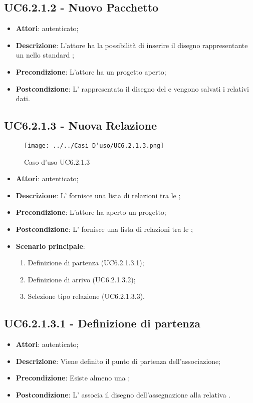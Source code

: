 \subsection{UC6.2.1.2 - Nuovo Pacchetto}
\label{ssec:UC6.2.1.2}
\begin{itemize}
\item \textbf{Attori}:  autenticato;
\item \textbf{Descrizione}: L'attore ha la possibilità di inserire il disegno rappresentante un  nello standard ;
\item \textbf{Precondizione}: L'attore ha un progetto aperto;
\item \textbf{Postcondizione}: L' rappresentata il disegno del  e vengono salvati i relativi dati.
\end{itemize}
\newpage
\subsection{UC6.2.1.3 - Nuova Relazione}
\label{ssec:UC6.2.1.3}
\begin{figure}[h!]
\centering
\texttt{[image: ../../Casi D'uso/UC6.2.1.3.png]}
\caption{Caso d'uso UC6.2.1.3}
 \end{figure}
\begin{itemize}
\item \textbf{Attori}:  autenticato;
\item \textbf{Descrizione}: L' fornisce una lista di relazioni tra le ;
\item \textbf{Precondizione}: L'attore ha aperto un progetto;
\item \textbf{Postcondizione}: L' fornisce una lista di relazioni tra le ;
\item \textbf{Scenario principale}: \begin{enumerate}\item Definizione  di partenza (UC6.2.1.3.1);\item Definizione  di arrivo (UC6.2.1.3.2);\item Selezione tipo relazione (UC6.2.1.3.3).
 \end{enumerate}
\end{itemize}
\subsection{UC6.2.1.3.1 - Definizione  di partenza}
\label{ssec:UC6.2.1.3.1}
\begin{itemize}
\item \textbf{Attori}:  autenticato;
\item \textbf{Descrizione}: Viene definito il punto di partenza dell'associazione;
\item \textbf{Precondizione}: Esiste almeno una ;
\item \textbf{Postcondizione}: L' associa il disegno dell'assegnazione alla relativa .
\end{itemize}
